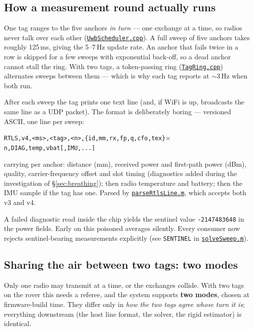 \documentclass[11pt,a4paper]{article}
\newcommand{\gh}[2]{\href{https://github.com/AdershM-2/UWB_3/blob/main/#1}{\texttt{#2}}}
\newcommand{\code}[1]{\texttt{#1}}
\begin{document}
\subsection{How a measurement round actually runs}
\label{sec:protocol}

One tag ranges to the five anchors \emph{in turn} --- one exchange at a time, so
radios never talk over each other
(\gh{libraries/UwbRtls/src/UwbScheduler.cpp}{UwbScheduler.cpp}). A full sweep of
five anchors takes roughly 125\,ms, giving the 5--7\,Hz update rate. An anchor that
fails twice in a row is skipped for a few sweeps with exponential back-off, so a
dead anchor cannot stall the ring. With two tags, a token-passing ring
(\gh{libraries/UwbRtls/src/TagRing.cpp}{TagRing.cpp}) alternates sweeps between
them --- which is why each tag reports at $\sim$3\,Hz when both run.

After each sweep the tag prints one text line (and, if WiFi is up, broadcasts the
same line as a UDP packet). The format is deliberately boring --- versioned ASCII,
one line per sweep:
\begin{center}\small
\code{RTLS,v4,<ms>,<tag>,<n>,\{id,mm,rx,fp,q,cfo,tex\}$\times$n,DIAG,temp,vbat[,IMU,...]}
\end{center}
carrying per anchor: distance (mm), received power and first-path power (dBm),
quality, carrier-frequency offset and slot timing (diagnostics added during the
investigation of \S\ref{sec:breathing}); then radio temperature and battery; then
the IMU sample if the tag has one. Parsed by
\gh{matlab/+dune/parseRtlsLine.m}{parseRtlsLine.m}, which accepts both v3 and v4.

\begin{pitfall}
A failed diagnostic read inside the chip yields the sentinel value
\code{-2147483648} in the power fields. Early on this poisoned averages silently.
Every consumer now rejects sentinel-bearing measurements explicitly
(see \code{SENTINEL} in \gh{matlab/+dune/solveSweep.m}{solveSweep.m}).
\end{pitfall}

\subsection{Sharing the air between two tags: two modes}
\label{sec:coord}

Only one radio may transmit at a time, or the exchanges collide. With two tags on
the rover this needs a referee, and the system supports \textbf{two modes}, chosen
at firmware-build time. They differ only in \emph{how the two tags agree whose turn
it is}; everything downstream (the host line format, the solver, the rigid
estimator) is identical.
\end{document}
